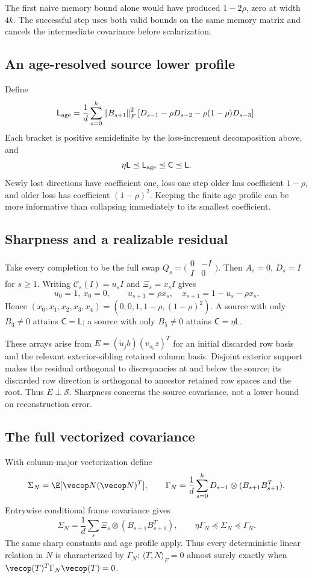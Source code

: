 \documentclass[11pt,oneside,openany,a4paper]{book}
\numberwithin{equation}{chapter}
\theoremstyle{definition}
\theoremstyle{remark}
\newcommand{\F}[1]{\left\lVert#1\right\rVert_F}
\newcommand{\Cov}{\mathsf C}\newcommand{\Loss}{\mathsf L}\newcommand{\Fil}{\mathcal F}
\begin{document}
The first naive memory bound alone would have produced $1-2\rho$, zero at width $4k$. The successful step uses both valid bounds on the same memory matrix and cancels the intermediate covariance before scalarization.

\subsection{An age-resolved source lower profile}
Define
\[
 \Loss_{\rm age}=\frac1d\sum_{s=0}^{h}\F{B_{s+1}}^2
 [D_{s-1}-\rho D_{s-2}-\rho(1-\rho)D_{s-3}].
\]
Each bracket is positive semidefinite by the loss-increment decomposition above, and
\begin{equation}\label{base:new:ageC}
 \eta\Loss\preceq\Loss_{\rm age}\preceq\Cov\preceq\Loss.
\end{equation}
Newly lost directions have coefficient one, loss one step older has coefficient $1-\rho$, and older loss has coefficient $(1-\rho)^2$. Keeping the finite age profile can be more informative than collapsing immediately to its smallest coefficient.

\subsection{Sharpness and a realizable residual}
Take every completion to be the full swap
$Q_s=\bigl(\begin{smallmatrix}0&-I\\I&0\end{smallmatrix}\bigr)$.
Then $A_s=0$, $D_s=I$ for $s\ge1$. Writing $\mathcal C_s(I)=u_sI$ and $\Xi_s=x_sI$ gives
\[
 u_0=1,\ x_0=0,\qquad u_{s+1}=\rho x_s,
 \quad x_{s+1}=1-u_s-\rho x_s.
\]
Hence $(x_0,x_1,x_2,x_3,x_4)=(0,0,1,1-\rho,(1-\rho)^2)$. A source with only $B_3\ne0$ attains $\Cov=\Loss$; a source with only $B_5\ne0$ attains $\Cov=\eta\Loss$.

These arrays arise from $E=(\widetilde u_jb)(v_{s_5}z)^T$ for an initial discarded row basis and the relevant exterior-sibling retained column basis. Disjoint exterior support makes the residual orthogonal to discrepancies at and below the source; its discarded row direction is orthogonal to ancestor retained row spaces and the root. Thus $E\perp\mathcal S$. Sharpness concerns the source covariance, not a lower bound on reconstruction error.

\subsection{The full vectorized covariance}
With column-major vectorization define
\[
 \Sigma_N=\E[\vecop N(\vecop N)^T],\qquad
 \Gamma_N=\frac1d\sum_{s=0}^{h}D_{s-1}\otimes(B_{s+1}B_{s+1}^T).
\]
Entrywise conditional frame covariance gives
\[
 \Sigma_N=\frac1d\sum_s\Xi_s\otimes(B_{s+1}B_{s+1}^T),\qquad
 \eta\Gamma_N\preceq\Sigma_N\preceq\Gamma_N.
\]
The same sharp constants and age profile apply. Thus every deterministic linear relation in $N$ is characterized by $\Gamma_N$: $\langle T,N\rangle_F=0$ almost surely exactly when $\vecop(T)^T\Gamma_N\vecop(T)=0$.
\end{document}
